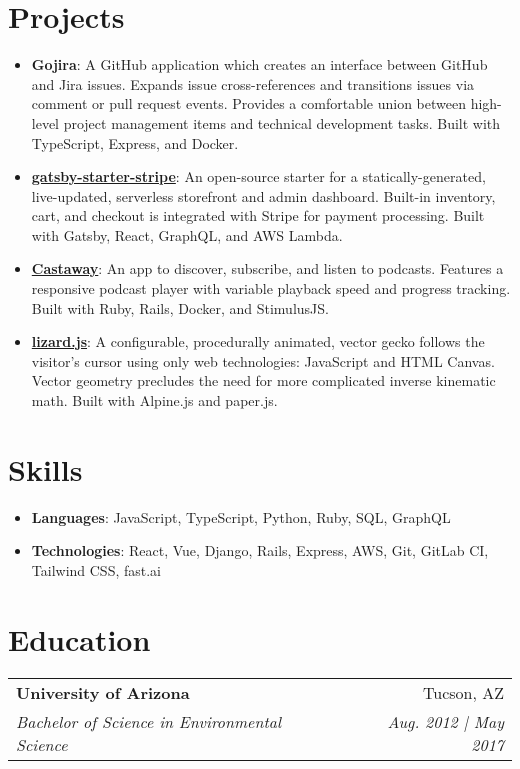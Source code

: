 \documentclass[letterpaper,11pt]{article}
\makeatletter
\newcommand{\resumeSubheading}[4]{
  \vspace{5pt}
  \begin{tabular*}{0.97\textwidth}[t]{l@{\extracolsep{\fill}}r}
    \textbf{#1} & #2 \\
    \textit{\small#3} & \textit{\small #4} \\
  \end{tabular*}\vspace{-5pt}
}
\newenvironment{resumeList}{\begin{itemize}[leftmargin=*]}{\end{itemize}\vspace{-5pt}}
\newcommand{\resumeTitledItem}[2]{
  \item\small{
    \textbf{#1}{: #2 \vspace{-2pt}}
  }
}
\makeatother
\begin{document}
\section{Projects}
  \begin{resumeList}
    \resumeTitledItem{Gojira}
      {A GitHub application which creates an interface between GitHub and Jira issues. Expands issue cross-references and transitions issues via comment or pull request events. Provides a comfortable union between high-level project management items and technical development tasks. Built with TypeScript, Express, and Docker.}
    \resumeTitledItem{\href{https://github.com/brxck/gatsby-starter-stripe}{gatsby-starter-stripe}}
      {An open-source starter for a statically-generated, live-updated, serverless storefront and admin dashboard. Built-in inventory, cart, and checkout is integrated with Stripe for payment processing. Built with Gatsby, React, GraphQL, and AWS Lambda.}
    \resumeTitledItem{\href{https://castaway.by.brxck.dev}{Castaway}}
      {An app to discover, subscribe, and listen to podcasts. Features a responsive podcast player with variable playback speed and progress tracking. Built with Ruby, Rails, Docker, and StimulusJS.}
    \resumeTitledItem{\href{https://brxck.github.io/lizard.js/}{lizard.js}}
      {A configurable, procedurally animated, vector gecko follows the visitor's cursor using only web technologies: JavaScript and HTML Canvas. Vector geometry precludes the need for more complicated inverse kinematic math. Built with Alpine.js and paper.js.}
  \end{resumeList}

\section{Skills}
  \begin{resumeList}
    \resumeTitledItem{Languages}{JavaScript, TypeScript, Python, Ruby, SQL, GraphQL}
    \resumeTitledItem{Technologies}{React, Vue, Django, Rails, Express, AWS, Git, GitLab CI, Tailwind CSS, fast.ai}
  \end{resumeList}

\section{Education}
  \resumeSubheading
  {University of Arizona}{Tucson, AZ}
  {Bachelor of Science in Environmental Science}{Aug. 2012 | May 2017}
\end{document}
